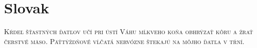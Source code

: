

\presection\section*{\checkno Slovak}\postsection

\noindent\textsc{
Kŕdeľ šťastných ďatľov učí pri ústí Váhu mĺkveho koňa obhrýzať kôru a žrať čerstvé mäso.
Päťtýždňové vĺčatá nervózne štekajú na môjho ďatľa v tŕní. 
}
